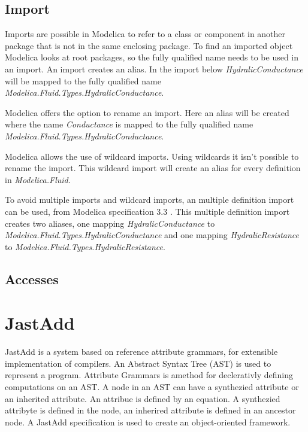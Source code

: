 \documentclass{cslthse-msc}
\begin{document}
\subsection{Import}
Imports are possible in Modelica to refer to a class or component in another package that is not in the same enclosing package. To find an imported object Modelica looks at root packages, so the fully qualified name needs to be used in an import. An import creates an alias. In the import below \textit{HydralicConductance} will be mapped to the fully qualified name \textit{Modelica.Fluid.Types.HydralicConductance}.



Modelica offers the option to rename an import. Here an alias will be created where the name \textit{Conductance} is mapped to the fully qualified name \textit{Modelica.Fluid.Types.HydralicConductance}.



Modelica allows the use of wildcard imports. Using wildcards it isn't possible to rename the import. This wildcard import will create an alias for every definition in \textit{Modelica.Fluid}.



To avoid multiple imports and wildcard imports, an multiple definition import can be used, from Modelica specification 3.3 \cite{modelicamodelica}. This multiple definition import creates two aliases, one mapping \textit{HydralicConductance} to \textit{Modelica.Fluid.Types.HydralicConductance} and one mapping \textit{HydralicResistance} to \textit{Modelica.Fluid.Types.HydralicResistance}.



\subsection{Accesses}

\section{JastAdd}
JastAdd is a system based on reference attribute grammars, for extensible implementation of compilers. An Abstract Syntax Tree (AST) is used to represent a program. Attribute Grammars is amethod for declerativly defining computations on an AST. A node in an AST can have a synthezied attribute or an inherited attribute. An attribue is defined by an equation. A synthezied attribyte is defined in the node, an inherired attribute is defined in an ancestor node. A JastAdd specification is used to create an object-oriented framework.~\cite{aakesson2008development}
\end{document}
